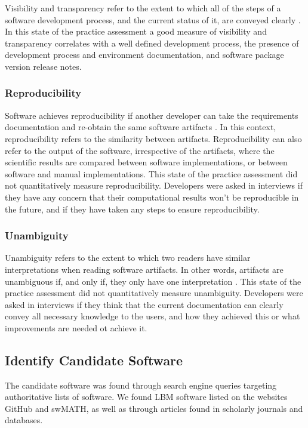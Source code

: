 \documentclass[12pt, notitlepage]{article}
\begin{document}
Visibility and transparency refer to the extent to which all of the steps of a software development process, and the current status of it, are conveyed clearly \citep{ghezzi1991fundamentals}. In this state of the practice assessment a good measure of visibility and transparency correlates with a well defined development process, the presence of development process and environment documentation, and software package version release notes. 

\subsubsection{Reproducibility}

Software achieves reproducibility if another developer can take the requirements documentation and re-obtain the same software artifacts \citep{BenureauAndRougier2017}. In this context, reproducibility refers to the similarity between artifacts. Reproducibility can also refer to the output of the software, irrespective of the artifacts, where the scientific results are compared between software implementations, or between software and manual implementations. This state of the practice assessment did not quantitatively measure reproducibility. Developers were asked in interviews if they have any concern that their computational results won’t be reproducible in the future, and if they have taken any steps to ensure reproducibility.

\subsubsection{Unambiguity}

Unambiguity refers to the extent to which two readers have similar interpretations when reading software artifacts. In other words, artifacts are unambiguous if, and only if, they only have one interpretation \citep{IEEE1998}. This state of the practice assessment did not quantitatively measure unambiguity. Developers were asked in interviews if they think that the current documentation can clearly convey all necessary knowledge to the users, and how they achieved this or what improvements are needed ot achieve it.

\subsection{Identify Candidate Software}\label{identifysoftware}

The candidate software was found through search engine queries targeting authoritative lists of software. We found LBM software listed on the websites GitHub and swMATH, as well as through articles found in scholarly journals and databases. 
\end{document}
